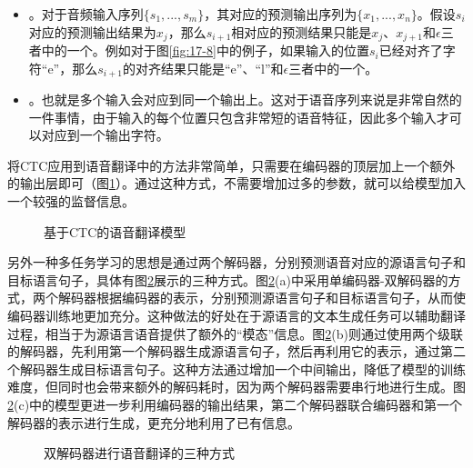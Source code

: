 \begin{itemize}
    \vspace{0.5em}
    \item {\small{}}。对于音频输入序列$\{ s_1,...,s_m \} $，其对应的预测输出序列为$\{x_1,...,x_n \} $。假设$s_i$对应的预测输出结果为$x_j$，那么$s_{i+1}$相对应的预测结果只能是$x_j$、$x_{j+1}$和$\epsilon$三者中的一个。例如对于图\ref{fig:17-8}中的例子，如果输入的位置$s_i$已经对齐了字符“e”，那么$s_{i+1}$的对齐结果只能是“e”、“l”和$\epsilon$三者中的一个。
    \vspace{0.5em}
    \item {\small{}}。也就是多个输入会对应到同一个输出上。这对于语音序列来说是非常自然的一件事情，由于输入的每个位置只包含非常短的语音特征，因此多个输入才可以对应到一个输出字符。
    \vspace{0.5em}
\end{itemize}

\parinterval 将CTC应用到语音翻译中的方法非常简单，只需要在编码器的顶层加上一个额外的输出层即可（图\ref{fig:17-9}）。通过这种方式，不需要增加过多的参数，就可以给模型加入一个较强的监督信息。

\begin{figure}[htp]
\centering

\caption{基于CTC的语音翻译模型}
\label{fig:17-9}
\end{figure}

\parinterval 另外一种多任务学习的思想是通过两个解码器，分别预测语音对应的源语言句子和目标语言句子，具体有图\ref{fig:17-10}展示的三种方式。图\ref{fig:17-10}(a)中采用单编码器-双解码器的方式，两个解码器根据编码器的表示，分别预测源语言句子和目标语言句子，从而使编码器训练地更加充分。这种做法的好处在于源语言的文本生成任务可以辅助翻译过程，相当于为源语言语音提供了额外的“模态”信息。图\ref{fig:17-10}(b)则通过使用两个级联的解码器，先利用第一个解码器生成源语言句子，然后再利用它的表示，通过第二个解码器生成目标语言句子。这种方法通过增加一个中间输出，降低了模型的训练难度，但同时也会带来额外的解码耗时，因为两个解码器需要串行地进行生成。图\ref{fig:17-10}(c)中的模型更进一步利用编码器的输出结果，第二个解码器联合编码器和第一个解码器的表示进行生成，更充分地利用了已有信息。
\begin{figure}[htp]
\centering

\caption{双解码器进行语音翻译的三种方式}
\label{fig:17-10}
\end{figure}


